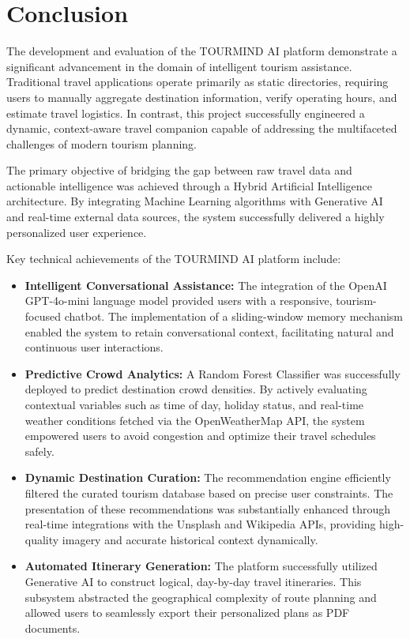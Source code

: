 
\section{Conclusion}
\label{sec:conclusion}

The development and evaluation of the TOURMIND AI platform demonstrate a significant advancement in the domain of intelligent tourism assistance. Traditional travel applications operate primarily as static directories, requiring users to manually aggregate destination information, verify operating hours, and estimate travel logistics. In contrast, this project successfully engineered a dynamic, context-aware travel companion capable of addressing the multifaceted challenges of modern tourism planning.

The primary objective of bridging the gap between raw travel data and actionable intelligence was achieved through a Hybrid Artificial Intelligence architecture. By integrating Machine Learning algorithms with Generative AI and real-time external data sources, the system successfully delivered a highly personalized user experience.

Key technical achievements of the TOURMIND AI platform include:
\begin{itemize}
    \item \textbf{Intelligent Conversational Assistance:} The integration of the OpenAI GPT-4o-mini language model provided users with a responsive, tourism-focused chatbot. The implementation of a sliding-window memory mechanism enabled the system to retain conversational context, facilitating natural and continuous user interactions.
    \item \textbf{Predictive Crowd Analytics:} A Random Forest Classifier was successfully deployed to predict destination crowd densities. By actively evaluating contextual variables such as time of day, holiday status, and real-time weather conditions fetched via the OpenWeatherMap API, the system empowered users to avoid congestion and optimize their travel schedules safely.
    \item \textbf{Dynamic Destination Curation:} The recommendation engine efficiently filtered the curated tourism database based on precise user constraints. The presentation of these recommendations was substantially enhanced through real-time integrations with the Unsplash and Wikipedia APIs, providing high-quality imagery and accurate historical context dynamically.
    \item \textbf{Automated Itinerary Generation:} The platform successfully utilized Generative AI to construct logical, day-by-day travel itineraries. This subsystem abstracted the geographical complexity of route planning and allowed users to seamlessly export their personalized plans as PDF documents.
\end{itemize}

